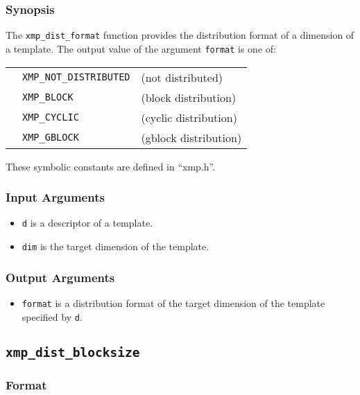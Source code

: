 \subsubsection*{Synopsis}

The {\tt xmp\_dist\_format} function provides the distribution format of
a dimension of a template. The output value of the argument {\tt format}
is one of:

\begin{tabular}{lll}
       \hspace{2.5cm} & {\tt XMP\_NOT\_DISTRIBUTED} & (not distributed)\\
                      & {\tt XMP\_BLOCK}  & (block distribution) \\
                      & {\tt XMP\_CYCLIC} & (cyclic distribution) \\
                      & {\tt XMP\_GBLOCK} & (gblock distribution) \\
\end{tabular}

These symbolic constants are defined in ``xmp.h''.

\subsubsection*{Input Arguments}
\begin{itemize}
 \item {\tt d} is a descriptor of a template.
 \item {\tt dim} is the target dimension of the template.
\end{itemize}

\subsubsection*{Output Arguments}
\begin{itemize}
 \item {\tt format} is a distribution format of the target dimension of
       the template specified by {\tt d}.
\end{itemize}


\subsection{\tt xmp\_dist\_blocksize}

\subsubsection*{Format}

